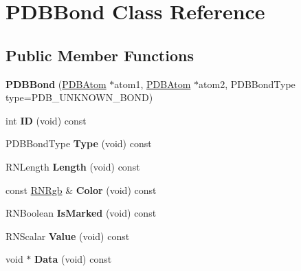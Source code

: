 \hypertarget{class_p_d_b_bond}{}\section{P\+D\+B\+Bond Class Reference}
\label{class_p_d_b_bond}
\subsection*{Public Member Functions}
\begin{DoxyCompactItemize}
\item 
{\bfseries P\+D\+B\+Bond} (\hyperlink{class_p_d_b_atom}{P\+D\+B\+Atom} $\ast$atom1, \hyperlink{class_p_d_b_atom}{P\+D\+B\+Atom} $\ast$atom2, P\+D\+B\+Bond\+Type type=P\+D\+B\+\_\+\+U\+N\+K\+N\+O\+W\+N\+\_\+\+B\+O\+ND)\hypertarget{class_p_d_b_bond_a75c5039a4164bba041a9f4dd0227384f}{}\label{class_p_d_b_bond_a75c5039a4164bba041a9f4dd0227384f}

\item 
int {\bfseries ID} (void) const \hypertarget{class_p_d_b_bond_a57aaf4fbcc9cd01cec328a32037ca490}{}\label{class_p_d_b_bond_a57aaf4fbcc9cd01cec328a32037ca490}

\item 
P\+D\+B\+Bond\+Type {\bfseries Type} (void) const \hypertarget{class_p_d_b_bond_ae256a776450b984978226a93819f6206}{}\label{class_p_d_b_bond_ae256a776450b984978226a93819f6206}

\item 
R\+N\+Length {\bfseries Length} (void) const \hypertarget{class_p_d_b_bond_a164a8204b8b353c5761d6f00be8c75ff}{}\label{class_p_d_b_bond_a164a8204b8b353c5761d6f00be8c75ff}

\item 
const \hyperlink{class_r_n_rgb}{R\+N\+Rgb} \& {\bfseries Color} (void) const \hypertarget{class_p_d_b_bond_aab2c589208886d46b5f2211bfc9b9f03}{}\label{class_p_d_b_bond_aab2c589208886d46b5f2211bfc9b9f03}

\item 
R\+N\+Boolean {\bfseries Is\+Marked} (void) const \hypertarget{class_p_d_b_bond_a316ef4e19291144976d03373b147569b}{}\label{class_p_d_b_bond_a316ef4e19291144976d03373b147569b}

\item 
R\+N\+Scalar {\bfseries Value} (void) const \hypertarget{class_p_d_b_bond_aa7105fcacc9988a25aaa255bcede60c8}{}\label{class_p_d_b_bond_aa7105fcacc9988a25aaa255bcede60c8}

\item 
void $\ast$ {\bfseries Data} (void) const \hypertarget{class_p_d_b_bond_a3a7f316bf5030e136c14e9b9ade5ae1a}{}\label{class_p_d_b_bond_a3a7f316bf5030e136c14e9b9ade5ae1a}


\end{DoxyCompactItemize}
